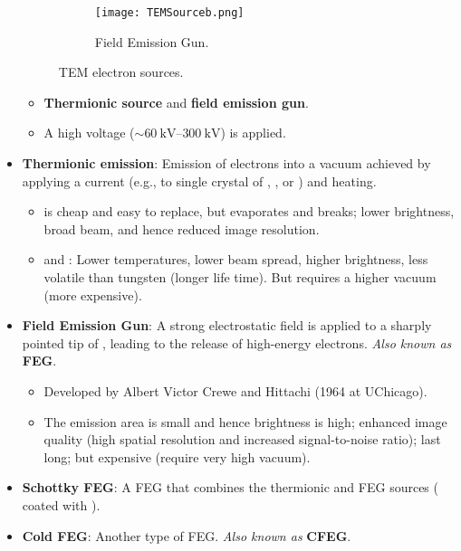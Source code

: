 \documentclass[../notes.tex]{subfiles}
\begin{document}
\begin{itemize}
\begin{figure}[H]
\begin{subfigure}[b]{0.4\linewidth}
            \label{fig:TEMSourcea}
        \end{subfigure}
        \begin{subfigure}[b]{0.4\linewidth}
            \centering
            \texttt{[image: TEMSourceb.png]}
            \caption{Field Emission Gun.}
            \label{fig:TEMSourceb}
        \end{subfigure}
        \caption{TEM electron sources.}
        \label{fig:TEMSource}
    \end{figure}
    \begin{itemize}
        \item \textbf{Thermionic source} and \textbf{field emission gun}.
        \item A high voltage ($\sim\SIrange{60}{300}{\kilo\volt}$) is applied.
    \end{itemize}
    \item \textbf{Thermionic emission}: Emission of electrons into a vacuum achieved by applying a current (e.g., to single crystal of , , or ) and heating.
    \begin{itemize}
        \item {} is cheap and easy to replace, but evaporates and breaks; lower brightness, broad beam, and hence reduced image resolution.
        \item {} and : Lower temperatures, lower beam spread, higher brightness, less volatile than tungsten (longer life time). But requires a higher vacuum (more expensive).
    \end{itemize}
    \item \textbf{Field Emission Gun}: A strong electrostatic field is applied to a sharply pointed tip of , leading to the release of high-energy electrons. \emph{Also known as} \textbf{FEG}.
    \begin{itemize}
        \item Developed by Albert Victor Crewe and Hittachi (1964 at UChicago).
        \item The emission area is small and hence brightness is high; enhanced image quality (high spatial resolution and increased signal-to-noise ratio); last long; but expensive (require very high vacuum).
    \end{itemize}
    \item \textbf{Schottky FEG}: A FEG that combines the thermionic and FEG sources ( coated with ).
    \item \textbf{Cold FEG}: Another type of FEG. \emph{Also known as} \textbf{CFEG}.

\end{itemize}
\end{document}
